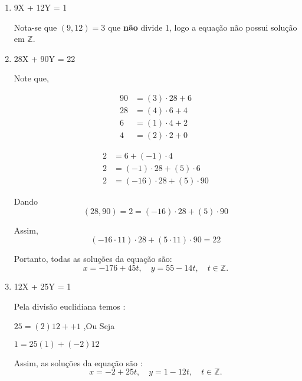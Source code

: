         \begin{enumerate}[left=0.5cm, align=left, nosep]
            
            \item 9X + 12Y = 1
            
                Nota-se que $(9,12) = 3$ que \textbf{não} divide 1, logo a equação não possui solução em $\mathbb{Z}$. 
            
            \item 28X + 90Y = 22
            
                Note que,
                \begin{minipage}[t]{0.45\linewidth}
                    \begin{align*}
                            90 &= (3)\cdot 28 + 6 \\
                            28 &= (4)\cdot 6 + 4 \\
                            6  &= (1)\cdot 4 + 2 \\
                            4  &= (2)\cdot 2 + 0
                    \end{align*}
                \end{minipage}\hfill
                \begin{minipage}[t]{0.45\linewidth}
                    \begin{align*}
                        2  &= 6 + (-1)\cdot 4 \\
                        2  &= (-1)\cdot 28 + (5)\cdot 6 \\
                        2  &= (-16)\cdot 28 + (5)\cdot 90
                    \end{align*}
                \end{minipage}

                Dando 
                \[
                    (28,90) = 2 = (-16)\cdot 28 + (5)\cdot 90
                \]

                Assim, 
                \[
                    (-16 \cdot 11)\cdot 28 + (5 \cdot 11)\cdot 90 = 22
                \]

                Portanto, todas as soluções da equação são:
                \[
                    x = -176 + 45t, \quad y = 55 - 14t, \quad t \in \mathbb{Z}.
                \]

            \item 12X + 25Y = 1
    
                Pela divisão euclidiana temos : 
                
                $25 = (2)12 + + 1$ ,Ou Seja
                
                $1 = 25(1) + (-2)12$
                
                Assim, as soluções da equação são : 
                \[
                    x = -2 + 25t, \quad y = 1 - 12t, \quad t \in \mathbb{Z}.
                \]

        \end{enumerate}
